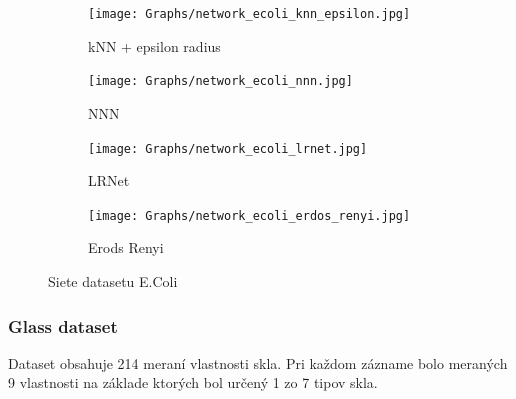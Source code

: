 \documentclass[slovak,master,dept460,male,cpp,cpdeclaration]{diploma}
\begin{document}
\begin{figure}[H]
\centering
\begin{subfigure}{0.45\textwidth}
    \centering
    \texttt{[image: Graphs/network\_ecoli\_knn\_epsilon.jpg]}
    \caption{kNN + epsilon radius}
    \label{fig:wine_knn_eps}
\end{subfigure}\hfil
\begin{subfigure}{0.45\textwidth}
    \centering
    \texttt{[image: Graphs/network\_ecoli\_nnn.jpg]}
    \caption{NNN}
    \label{fig:wine_nnn}
\end{subfigure}
\medskip
\begin{subfigure}{0.45\textwidth}
    \centering
    \texttt{[image: Graphs/network\_ecoli\_lrnet.jpg]}
    \caption{LRNet}
    \label{fig:wine_lrnet}
\end{subfigure}\hfil
\begin{subfigure}{0.45\textwidth}
    \centering
    \texttt{[image: Graphs/network\_ecoli\_erdos\_renyi.jpg]}
    \caption{Erods Renyi}
    \label{fig:wine_erdos_renyi}
\end{subfigure}
\caption{Siete datasetu E.Coli}
\label{fig:wine_networks}
\end{figure}

\subsubsection{Glass dataset}
Dataset obsahuje 214 meraní vlastnosti skla. Pri každom zázname bolo meraných 9 vlastnosti na základe ktorých bol určený  1 zo 7 tipov skla. \cite{glass}
\end{document}
